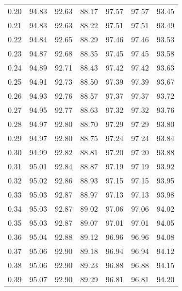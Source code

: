 \begin{tabular}{|c|c|c|c|c|c|c|}
      0.20 &     94.83 &     92.63 &      88.17 &   97.57 &      97.57 &         93.45 \\
      0.21 &     94.83 &     92.63 &      88.22 &   97.51 &      97.51 &         93.49 \\
      0.22 &     94.84 &     92.65 &      88.29 &   97.46 &      97.46 &         93.53 \\
      0.23 &     94.87 &     92.68 &      88.35 &   97.45 &      97.45 &         93.58 \\
      0.24 &     94.89 &     92.71 &      88.43 &   97.42 &      97.42 &         93.63 \\
      0.25 &     94.91 &     92.73 &      88.50 &   97.39 &      97.39 &         93.67 \\
      0.26 &     94.93 &     92.76 &      88.57 &   97.37 &      97.37 &         93.72 \\
      0.27 &     94.95 &     92.77 &      88.63 &   97.32 &      97.32 &         93.76 \\
      0.28 &     94.97 &     92.80 &      88.70 &   97.29 &      97.29 &         93.80 \\
      0.29 &     94.97 &     92.80 &      88.75 &   97.24 &      97.24 &         93.84 \\
      0.30 &     94.99 &     92.82 &      88.81 &   97.20 &      97.20 &         93.88 \\
      0.31 &     95.01 &     92.84 &      88.87 &   97.19 &      97.19 &         93.92 \\
      0.32 &     95.02 &     92.86 &      88.93 &   97.15 &      97.15 &         93.95 \\
      0.33 &     95.03 &     92.87 &      88.97 &   97.13 &      97.13 &         93.98 \\
      0.34 &     95.03 &     92.87 &      89.02 &   97.06 &      97.06 &         94.02 \\
      0.35 &     95.03 &     92.87 &      89.07 &   97.01 &      97.01 &         94.05 \\
      0.36 &     95.04 &     92.88 &      89.12 &   96.96 &      96.96 &         94.08 \\
      0.37 &     95.06 &     92.90 &      89.18 &   96.94 &      96.94 &         94.12 \\
      0.38 &     95.06 &     92.90 &      89.23 &   96.88 &      96.88 &         94.15 \\
      0.39 &     95.07 &     92.90 &      89.29 &   96.81 &      96.81 &         94.20 \\

\end{tabular}
